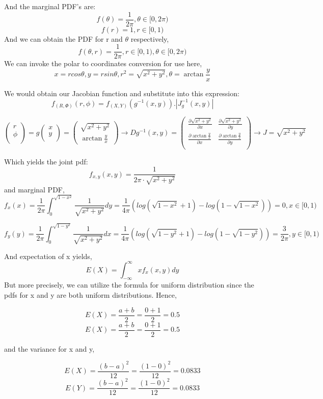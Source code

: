 And the marginal PDF's are:
$$ f(\theta) = \frac{1}{2\pi}, \theta \in [0, 2\pi) $$
$$ f(r) = 1, r \in [0, 1) $$
And we can obtain the PDF for r and $\theta$ respectively,
$$ f(\theta,r) = \frac{1}{2\pi}, r \in [0, 1), \theta \in [0, 2\pi) $$
We can invoke the polar to  coordinates conversion for use here,
\begin{equation} x = rcos\theta, y = rsin\theta, r^2 = \sqrt{x^2 + y^2}, \theta = \arctan{\frac{y}{x}} \label{q2b} \end{equation}

We would obtain our Jacobian function and substitute into this expression:
\begin{equation} f_(R,\Phi)(r,\phi) = f_(X,Y)(g^{-1}(x,y)).|J_g^{-1}(x,y)| \label{q3a1}\end{equation}

\renewcommand\arraystretch{2}

$$\left(\begin{array}{lllll}
r \\
\phi \\ 
\end{array} \right) = g\left(\begin{array}{lllll}
x \\
y \\ 
\end{array} \right) =  \left(\begin{array}{lllll}
\sqrt{x^2 + y^2} \\
\arctan{\frac{y}{x}}
\end{array} \right)
\to D{g^{-1}}(x,y)=
 \left(\begin{array}{lllll}
\frac{\partial \sqrt{x^2+y^2}}{\partial x}       & \frac{\partial \sqrt{x^2+y^2}}{\partial y} \\
\frac{\partial \arctan\frac{y}{x}}{\partial x}       & \frac{\partial \arctan\frac{y}{x}}{\partial y}\\
\end{array} \right) \to J = \sqrt{x^2 + y^2} $$
\renewcommand\arraystretch{1}

Which yields the joint pdf:
$$ f_{x,y}(x,y) = \frac{1}{2\pi \cdot \sqrt{x^2+y^2}} $$
and marginal PDF,
$$ f_x(x) = \frac{1}{2\pi} \int_{0}^{\sqrt{1-x^2}} \frac{1}{\sqrt{{x^2+y^2}}}dy = \frac{1}{4\pi}(log(\sqrt{1-x^2}+1) - log(1-\sqrt{1 - x^2})) = 0, x \in [0,1)  $$

$$ f_y(y) = \frac{1}{2\pi} \int_{0}^{\sqrt{1-y^2}} \frac{1}{\sqrt{{x^2+y^2}}}dx = \frac{1}{4\pi}(log(\sqrt{1-y^2}+1) - log(1-\sqrt{1 - y^2})) = \frac{3}{2\pi} , y \in [0,1)  $$

And expectation of x yields,
$$ E(X) = \int_{-\infty}^{\infty}xf_x(x,y)dy $$
But more precisely, we can utilize the formula for uniform distribution since the pdfs for x and y are both uniform distributions. Hence,

$$ E(X) = \frac{a+b}{2} = \frac{0+1}{2} = 0.5 $$
$$ E(X) = \frac{a+b}{2} = \frac{0+1}{2} = 0.5 $$

and the variance for x and y,

$$ E(X) = \frac{(b - a)^2}{12} = \frac{(1-0)^2}{12} = 0.0833 $$
$$ E(Y) = \frac{(b - a)^2}{12} = \frac{(1-0)^2}{12} = 0.0833 $$
